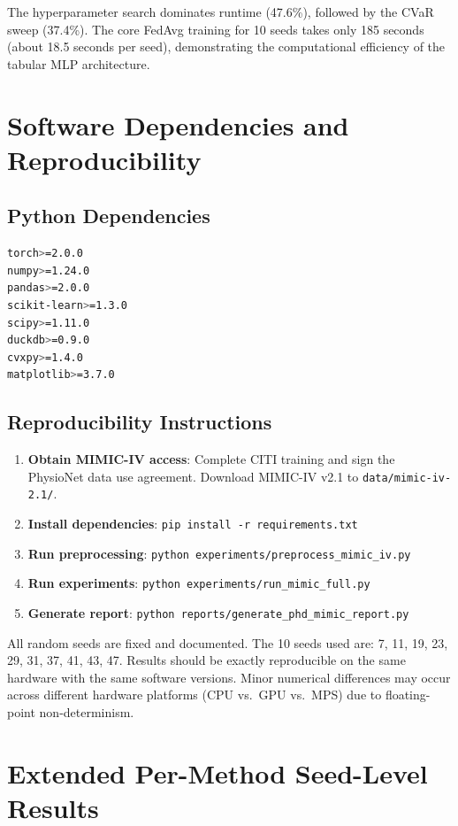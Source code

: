 \documentclass[11pt,a4paper]{report}
\begin{document}
The hyperparameter search dominates runtime (47.6\%), followed by the CVaR sweep (37.4\%). The core FedAvg training for 10 seeds takes only 185 seconds (about 18.5 seconds per seed), demonstrating the computational efficiency of the tabular MLP architecture.


\chapter{Software Dependencies and Reproducibility}

\section{Python Dependencies}

\begin{lstlisting}[language=bash,basicstyle=\small\ttfamily]
torch>=2.0.0
numpy>=1.24.0
pandas>=2.0.0
scikit-learn>=1.3.0
scipy>=1.11.0
duckdb>=0.9.0
cvxpy>=1.4.0
matplotlib>=3.7.0
\end{lstlisting}

\section{Reproducibility Instructions}

\begin{enumerate}[leftmargin=2em]
\item \textbf{Obtain MIMIC-IV access}: Complete CITI training and sign the PhysioNet data use agreement. Download MIMIC-IV v2.1 to \texttt{data/mimic-iv-2.1/}.
\item \textbf{Install dependencies}: \texttt{pip install -r requirements.txt}
\item \textbf{Run preprocessing}: \texttt{python experiments/preprocess\_mimic\_iv.py}
\item \textbf{Run experiments}: \texttt{python experiments/run\_mimic\_full.py}
\item \textbf{Generate report}: \texttt{python reports/generate\_phd\_mimic\_report.py}
\end{enumerate}

All random seeds are fixed and documented. The 10 seeds used are: 7, 11, 19, 23, 29, 31, 37, 41, 43, 47. Results should be exactly reproducible on the same hardware with the same software versions. Minor numerical differences may occur across different hardware platforms (CPU vs.\ GPU vs.\ MPS) due to floating-point non-determinism.


\chapter{Extended Per-Method Seed-Level Results}
\end{document}
